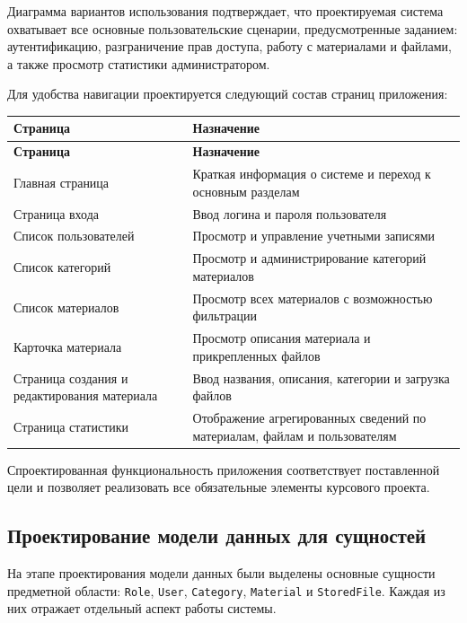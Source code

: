 Диаграмма вариантов использования подтверждает, что проектируемая система охватывает все основные пользовательские сценарии, предусмотренные заданием: аутентификацию, разграничение прав доступа, работу с материалами и файлами, а также просмотр статистики администратором.

Для удобства навигации проектируется следующий состав страниц приложения:

\begin{longtable}{>{\raggedright\arraybackslash}p{4.2cm} >{\raggedright\arraybackslash}p{9.8cm}}
\toprule
\textbf{Страница} & \textbf{Назначение} \\
\midrule
\endfirsthead

\toprule
\textbf{Страница} & \textbf{Назначение} \\
\midrule
\endhead

\bottomrule
\endlastfoot

Главная страница & Краткая информация о системе и переход к основным разделам \\
Страница входа & Ввод логина и пароля пользователя \\
Список пользователей & Просмотр и управление учетными записями \\
Список категорий & Просмотр и администрирование категорий материалов \\
Список материалов & Просмотр всех материалов с возможностью фильтрации \\
Карточка материала & Просмотр описания материала и прикрепленных файлов \\
Страница создания и редактирования материала & Ввод названия, описания, категории и загрузка файлов \\
Страница статистики & Отображение агрегированных сведений по материалам, файлам и пользователям \\
\end{longtable}

Спроектированная функциональность приложения соответствует поставленной цели и позволяет реализовать все обязательные элементы курсового проекта.

\subsection{Проектирование модели данных для сущностей}

На этапе проектирования модели данных были выделены основные сущности предметной области: \texttt{Role}, \texttt{User}, \texttt{Category}, \texttt{Material} и \texttt{StoredFile}. Каждая из них отражает отдельный аспект работы системы.

